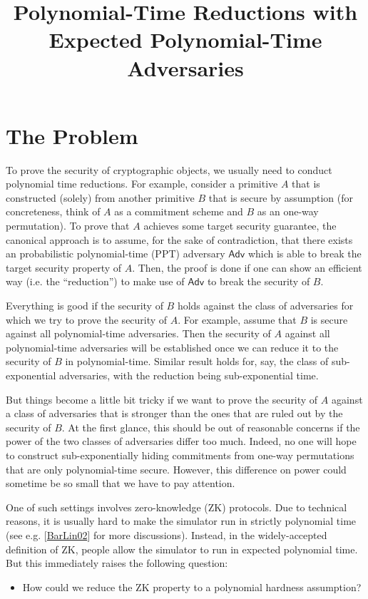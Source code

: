 \documentclass{article}
\newcommand{\Adv}{\mathsf{Adv}}
\begin{document}
\title{
Polynomial-Time Reductions with Expected Polynomial-Time Adversaries
}
\date{}
\maketitle

\section{The Problem}
To prove the security of cryptographic objects, we usually need to conduct polynomial time reductions. For example, consider a primitive $A$ that is constructed (solely) from another primitive $B$ that is secure by assumption (for concreteness, think of $A$ as a commitment scheme and $B$ as an one-way permutation). To prove that $A$ achieves some target security guarantee, the canonical approach is to assume, for the sake of contradiction, that there exists an probabilistic polynomial-time (PPT) adversary $\Adv$ which is able to break the target security property of $A$. Then, the proof is done if one can show an efficient way (i.e. the ``reduction'') to make use of $\Adv$ to break the security of $B$.  

Everything is good if the security of $B$ holds against the class of adversaries for which we try to prove the security of $A$. For example, assume that $B$ is secure against all polynomial-time adversaries. Then the security of $A$ against all polynomial-time adversaries will be established once we can reduce it to the security of $B$ in polynomial-time. Similar result holds for, say, the class of sub-exponential adversaries, with the reduction being sub-exponential time.

But things become a little bit tricky if we want to prove the security of $A$ against a class of adversaries that is stronger than the ones that are ruled out by the security of $B$. At the first glance, this should be out of reasonable concerns if the power of the two classes of adversaries differ too much. Indeed, no one will hope to construct sub-exponentially hiding commitments from one-way permutations that are only polynomial-time secure. However, this difference on power could sometime be so small that we have to pay attention.  

One of such settings involves zero-knowledge (ZK) protocols. Due to technical reasons, it is usually hard to make the simulator run in strictly polynomial time (see e.g. [\href{https://eprint.iacr.org/2002/043}{BarLin02}] for more discussions). Instead, in the widely-accepted definition of ZK, people allow the simulator to run in expected polynomial time. But this immediately raises the following question:
\begin{itemize}
	\item How could we reduce the ZK property to a polynomial hardness assumption?
\end{itemize}
\end{document}
